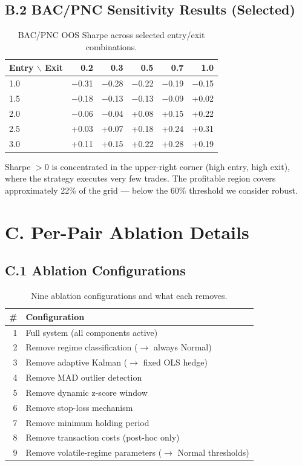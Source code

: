 \documentclass[conference]{IEEEtran}
\begin{document}
\subsection{B.2 BAC/PNC Sensitivity Results (Selected)}

\begin{table}[h]
\centering
\caption{BAC/PNC OOS Sharpe across selected entry/exit combinations.}
\label{tab:supp_bac_sens}
\small
\begin{tabular}{l|rrrrr}
\toprule
Entry $\backslash$ Exit & 0.2 & 0.3 & 0.5 & 0.7 & 1.0 \\
\midrule
1.0 & $-$0.31 & $-$0.28 & $-$0.22 & $-$0.19 & $-$0.15 \\
1.5 & $-$0.18 & $-$0.13 & $-$0.13 & $-$0.09 & +0.02 \\
2.0 & $-$0.06 & $-$0.04 & +0.08 & +0.15 & +0.22 \\
2.5 & +0.03 & +0.07 & +0.18 & +0.24 & +0.31 \\
3.0 & +0.11 & +0.15 & +0.22 & +0.28 & +0.19 \\
\bottomrule
\end{tabular}
\end{table}

Sharpe $> 0$ is concentrated in the upper-right corner (high entry, high exit),
where the strategy executes very few trades. The profitable region covers
approximately 22\% of the grid --- below the 60\% threshold we consider robust.

\section{C. Per-Pair Ablation Details}
\label{sec:ablation_detail}

\subsection{C.1 Ablation Configurations}

\begin{table}[h]
\centering
\caption{Nine ablation configurations and what each removes.}
\label{tab:supp_configs}
\small
\begin{tabular}{rl}
\toprule
\# & Configuration \\
\midrule
1 & Full system (all components active) \\
2 & Remove regime classification ($\rightarrow$ always Normal) \\
3 & Remove adaptive Kalman ($\rightarrow$ fixed OLS hedge) \\
4 & Remove MAD outlier detection \\
5 & Remove dynamic z-score window \\
6 & Remove stop-loss mechanism \\
7 & Remove minimum holding period \\
8 & Remove transaction costs (post-hoc only) \\
9 & Remove volatile-regime parameters ($\rightarrow$ Normal thresholds) \\
\bottomrule
\end{tabular}
\end{table}
\end{document}
